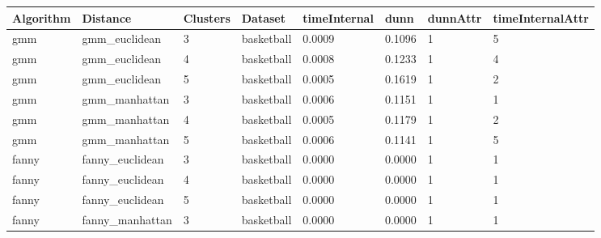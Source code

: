 \documentclass[
]{article}
\begin{document}
\begin{longtable}{| p{1.3cm} | p{2.1cm} | p{0.9cm} | p{1.1cm} | p{1.6cm} | p{0.8cm} | p{1.3cm} | p{1.9cm} |}
\hline
\scriptsize  Algorithm & \scriptsize     Distance     & \scriptsize Clusters & \scriptsize  Dataset  & \scriptsize timeInternal & \scriptsize  dunn  & \scriptsize dunnAttr & \scriptsize timeInternalAttr \\
\hline
\scriptsize     gmm    & \scriptsize   gmm\_euclidean & \scriptsize    3     & \scriptsize basketball & \scriptsize    0.0009    & \scriptsize 0.1096 & \scriptsize    1     & \scriptsize        5 \\
\scriptsize     gmm    & \scriptsize   gmm\_euclidean & \scriptsize    4     & \scriptsize basketball & \scriptsize    0.0008    & \scriptsize 0.1233 & \scriptsize    1     & \scriptsize        4 \\
\scriptsize     gmm    & \scriptsize   gmm\_euclidean & \scriptsize    5     & \scriptsize basketball & \scriptsize    0.0005    & \scriptsize 0.1619 & \scriptsize    1     & \scriptsize        2 \\
\cline{2-8}
\scriptsize     gmm    & \scriptsize   gmm\_manhattan & \scriptsize    3     & \scriptsize basketball & \scriptsize    0.0006    & \scriptsize 0.1151 & \scriptsize    1     & \scriptsize        1 \\
\scriptsize     gmm    & \scriptsize   gmm\_manhattan & \scriptsize    4     & \scriptsize basketball & \scriptsize    0.0005    & \scriptsize 0.1179 & \scriptsize    1     & \scriptsize        2 \\
\scriptsize     gmm    & \scriptsize   gmm\_manhattan & \scriptsize    5     & \scriptsize basketball & \scriptsize    0.0006    & \scriptsize 0.1141 & \scriptsize    1     & \scriptsize        5 \\
\hline
\scriptsize   fanny    & \scriptsize fanny\_euclidean & \scriptsize    3     & \scriptsize basketball & \scriptsize    0.0000    & \scriptsize 0.0000 & \scriptsize    1     & \scriptsize        1 \\
\scriptsize   fanny    & \scriptsize fanny\_euclidean & \scriptsize    4     & \scriptsize basketball & \scriptsize    0.0000    & \scriptsize 0.0000 & \scriptsize    1     & \scriptsize        1 \\
\scriptsize   fanny    & \scriptsize fanny\_euclidean & \scriptsize    5     & \scriptsize basketball & \scriptsize    0.0000    & \scriptsize 0.0000 & \scriptsize    1     & \scriptsize        1 \\
\cline{2-8}
\scriptsize   fanny    & \scriptsize fanny\_manhattan & \scriptsize    3     & \scriptsize basketball & \scriptsize    0.0000    & \scriptsize 0.0000 & \scriptsize    1     & \scriptsize        1 \\

\end{longtable}
\end{document}
